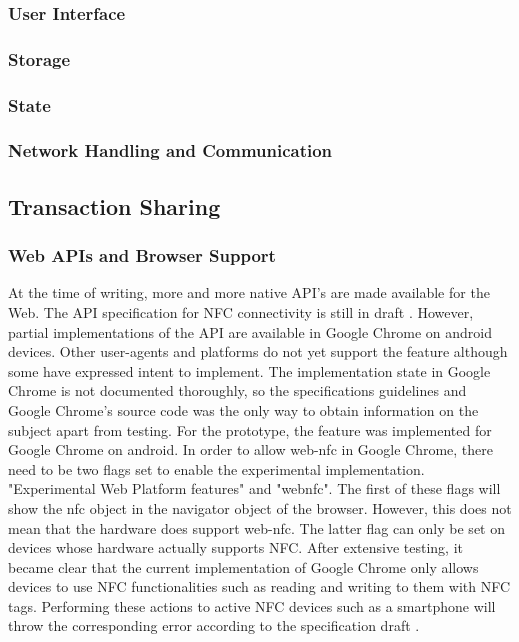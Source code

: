 \documentclass[a4paper]{article}
\begin{document}
\subsubsection{User Interface}
\subsubsection{Storage}
\subsubsection{State}
\subsubsection{Network Handling and Communication}

\subsection{Transaction Sharing}
\subsubsection{Web APIs and Browser Support}
At the time of writing, more and more native API's are made available for the Web. 
The API specification for NFC connectivity is still in draft \cite{web-nfc}. However, partial implementations of the API are available in Google Chrome on android devices. Other user-agents and platforms do not yet support the feature although some have expressed intent to implement. The implementation state in Google Chrome is not documented thoroughly, so the specifications guidelines and Google Chrome's source code was the only way to obtain information on the subject apart from testing.
For the prototype, the feature was implemented for Google Chrome on android.
In order to allow web-nfc in Google Chrome, there need to be two flags set to enable the experimental implementation.
"Experimental Web Platform features" and "webnfc". The first of these flags will show the nfc object in the navigator object of the browser. However, this does not mean that the hardware does support web-nfc. The latter flag can only be set on devices whose hardware actually supports NFC.
After extensive testing, it became clear that the current implementation of Google Chrome only allows devices to use NFC functionalities such as reading and writing to them with NFC tags. Performing these actions to active NFC devices such as a smartphone will throw the corresponding error according to the specification draft \cite{web-nfc}.
\end{document}
